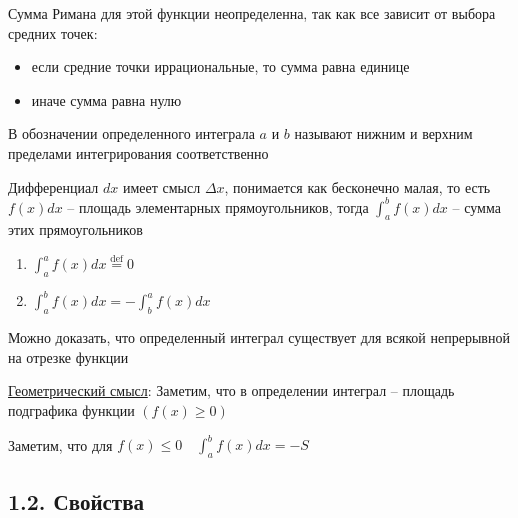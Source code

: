 \documentclass[12pt]{article}
\begin{document}
    Сумма Римана для этой функции неопределенна, так как все зависит от выбора средних точек:
    \begin{itemize}
        \item если средние точки иррациональные, то сумма равна единице
        \item иначе сумма равна нулю
    \end{itemize}

    В обозначении определенного интеграла $a$ и $b$ называют нижним и верхним пределами интегрирования соответственно

    Дифференциал $dx$ имеет смысл $\Delta x$, понимается как бесконечно малая, то есть 
    $f(x) dx$ -- площадь элементарных прямоугольников, тогда
    $\int^b_a f(x) dx$ -- сумма этих прямоугольников

    \vspace{5mm}

    \begin{enumerate}
        \item $\int_a^a f(x)dx \stackrel{\text{def}}{=} 0$
        \item $\int_a^b f(x)dx = -\int_b^a f(x)dx$
    \end{enumerate}

    Можно доказать, что определенный интеграл существует для всякой непрерывной на отрезке функции

    \underline{Геометрический смысл}: \hypertarget{integralgeommeaning}{Заметим, что в определении интеграл} -- площадь подграфика функции $(f(x) \geq 0)$

    Заметим, что для $f(x) \leq 0 \quad \int_a^b f(x)dx = -S$


    \subsection{1.2. Свойства}
    \hypertarget{integralproperties}{}
\end{document}
